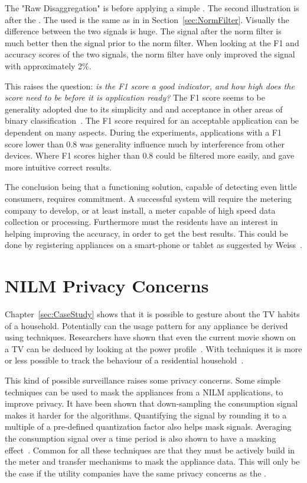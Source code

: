 The "Raw Disaggregation" is before applying a simple . The second illustration is after the . The  used is the same as in in Section~\ref{sec:NormFilter}. Visually the difference between the two signals is huge. The signal after the norm filter is much better then the signal prior to the norm filter. When looking at the F1 and accuracy scores of the two signals, the norm filter have only improved the signal with approximately 2\%.  

This raises the question: \textit{is the F1 score a good indicator, and how high does the score need to be before it is application ready?} The F1 score seems to be generality adopted due to its simplicity and and acceptance in other areas of binary classification~\citep{RefWorks:35}. The F1 score required for an acceptable application can be dependent on many aspects. During the experiments, applications with a F1 score lower than 0.8 was generality influence much by interference from other devices. Where F1 scores higher than 0.8 could be filtered more easily, and gave more intuitive correct results.  

The conclusion being that a functioning  solution, capable of detecting even little consumers, requires commitment. A successful system will require the metering company to develop, or at least install, a meter capable of high speed data collection or processing. Furthermore must the residents have an interest in helping improving the accuracy, in order to get the best results. This could be done by registering appliances on a smart-phone or tablet as suggested by Weiss~\citep{RefWorks:23}.
\newpage
\section{NILM Privacy Concerns}
Chapter~\ref{sec:CaseStudy} shows that it is possible to gesture about the TV habits of a household. Potentially can the usage pattern for any appliance be derived using  techniques. Researchers have shown that even the current movie shown on a TV can be deduced by looking at the power profile~\citep{RefWorks:39}. With  techniques it is more or less possible to track the behaviour of a residential household~\citep{RefWorks:37}.

This kind of possible surveillance raises some privacy concerns. Some simple techniques can be used to mask the appliances from a NILM applications, to improve privacy. It have been shown that down-sampling the consumption signal makes it harder for the  algorithms. Quantifying the signal by rounding it to a multiple of a pre-defined quantization factor also helps mask signals. Averaging the consumption signal over a time period is also shown to have a masking effect~\citep{RefWorks:40}. Common for all these techniques are that they must be actively build in the meter and transfer mechanisms to mask the appliance data. This will only be the case if the utility companies have the same privacy concerns as the . 

